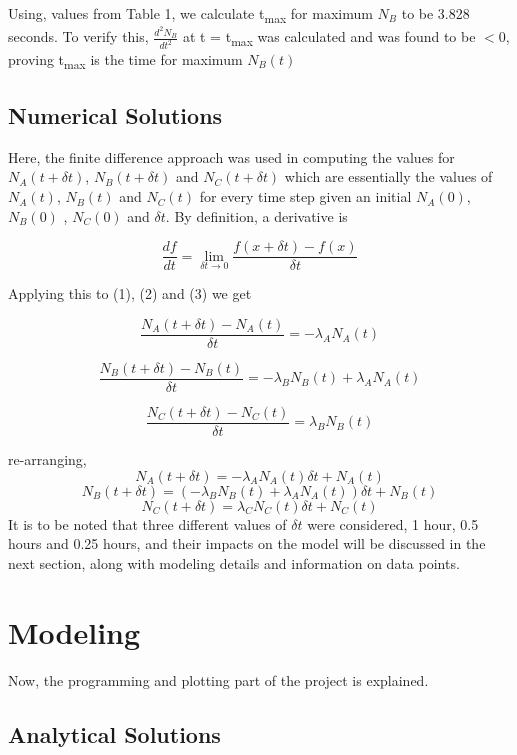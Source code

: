 \documentclass[11pt, oneside]{article}   	%
\begin{document}
Using, values from Table 1, we calculate t\textsubscript{max} for maximum $N_B$ to be 3.828 seconds. To verify this, $\frac{d^2N_B}{dt^2} $  at t = t\textsubscript{max} was calculated and was found to be $< 0$, proving t\textsubscript{max} is the time for maximum $N_B(t)$

 \subsection{Numerical Solutions}
 Here, the finite difference approach was used in computing the values for $N_A(t+\delta t)$, $N_B(t+\delta t)$ and $N_C(t+\delta t)$ which are essentially the values of $N_A(t)$, $N_B(t)$ and $N_C(t)$ for every time step given an initial $N_A(0)$, $N_B(0)$ , $N_C(0)$ and $\delta t$. By definition, a derivative is 
 
$$ \frac{df}{dt}  = \lim_{\delta t \rightarrow 0 } \frac{f(x+\delta t)-f(x)}{\delta t}$$

Applying this to (1), (2) and (3) we get

$$\frac{N_A(t+\delta t)-N_A(t)}{\delta t}  = - \lambda_A N_A(t)$$


$$\frac{N_B(t+\delta t)-N_B(t)}{\delta t}  = - \lambda_B N_B(t) + \lambda_A N_A(t)$$

$$\frac{N_C(t+\delta t)-N_C(t)}{\delta t}  =  \lambda_B N_B(t) $$

re-arranging, 
\begin{equation}
N_A(t+\delta t)  = - \lambda_A N_A(t)\delta t + N_A(t) 
\end{equation}
\begin{equation}
N_B(t+\delta t)  = (- \lambda_B N_B(t) + \lambda_A N_A(t))\delta t + N_B(t) 
\end{equation}
\begin{equation}
N_C(t+\delta t)  =  \lambda_C N_C(t)\delta t + N_C(t) 
\end{equation}
It is to be noted that three different values of $\delta t$ were considered, 1 hour, 0.5 hours and 0.25 hours, and their impacts on the model will be discussed in the next section, along with modeling details and information on data points. 

\newpage
\section{Modeling}

Now, the programming and plotting part of the project is explained.
\subsection{Analytical Solutions}
\end{document}
